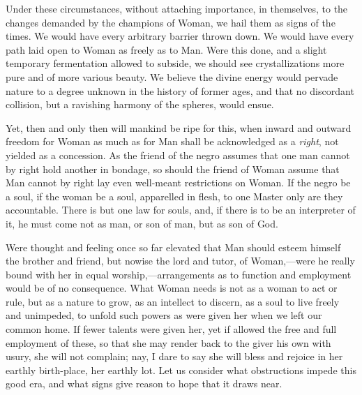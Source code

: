 Under these circumstances, without attaching importance, in
themselves, to the changes demanded by the champions of Woman, we hail
them as signs of the times. We would have every arbitrary barrier
thrown down. We would have every path laid open to Woman as freely as
to Man. Were this done, and a slight temporary fermentation allowed to
subside, we should see crystallizations more pure and of more various
beauty. We believe the divine energy would pervade nature to a degree
unknown in the history of former ages, and that no discordant
collision, but a ravishing harmony of the spheres, would ensue.

Yet, then and only then will mankind be ripe for this, when inward and
outward freedom for Woman as much as for Man shall be acknowledged as
a \textit{right}, not yielded as a concession. As the friend of the
negro assumes that one man cannot by right hold another in bondage, so
should the friend of Woman assume that Man cannot by right lay even
well-meant restrictions on Woman. If the negro be a soul, if the woman
be a soul, apparelled in flesh, to one Master only are they
accountable. There is but one law for souls, and, if there is to be an
interpreter of it, he must come not as man, or son of man, but as son
of God.

Were thought and feeling once so far elevated that  Man
should esteem himself the brother and friend, but nowise the lord and
tutor, of Woman,---were he really bound with her in equal
worship,---arrangements as to function and employment would be of no
consequence. What Woman needs is not as a woman to act or rule, but as
a nature to grow, as an intellect to discern, as a soul to live
freely and unimpeded, to unfold such powers as were given her when we
left our common home. If fewer talents were given her, yet if allowed
the free and full employment of these, so that she may render back to
the giver his own with usury, she will not complain; nay, I dare to
say she will bless and rejoice in her earthly birth-place, her earthly
lot. Let us consider what obstructions impede this good era, and what
signs give reason to hope that it draws near.

